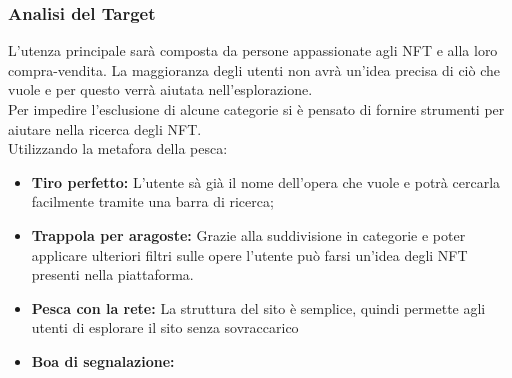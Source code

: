 \documentclass[10pt]{article}
\begin{document}
\subsubsection{Analisi del Target}
L'utenza principale sarà composta da persone appassionate agli NFT e alla loro compra-vendita. La maggioranza degli utenti non avrà un'idea precisa di ciò che vuole e per questo verrà aiutata nell'esplorazione.\\
Per impedire l'esclusione di alcune categorie si è pensato di fornire strumenti per aiutare nella ricerca degli NFT.\\
Utilizzando la metafora della pesca:
\begin{itemize}
    \item \textbf{Tiro perfetto:} L'utente sà già il nome dell'opera che vuole e potrà cercarla facilmente tramite una barra di ricerca;
    \item \textbf{Trappola per aragoste:} Grazie alla suddivisione in categorie e poter applicare ulteriori filtri sulle opere l'utente può farsi un'idea degli NFT presenti nella piattaforma.
    \item \textbf{Pesca con la rete:} La struttura del sito è semplice, quindi permette agli utenti di esplorare il sito senza sovraccarico
    \item \textbf{Boa di segnalazione:} 
\end{itemize}
\end{document}
